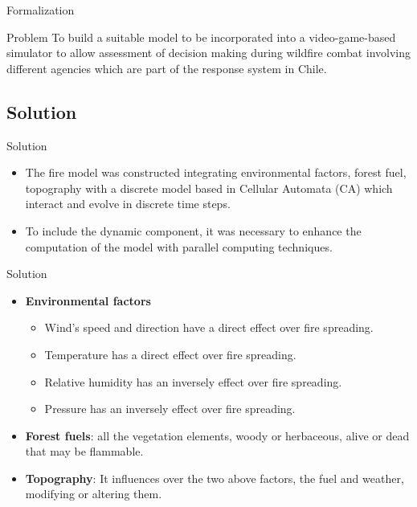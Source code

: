 \documentclass{beamer}
\begin{document}
        \begin{frame}{Formalization}
            \begin{block}{Problem}
                To build a suitable model to be incorporated into a video-game-based 
                simulator to allow assessment of decision making during wildfire combat 
                involving different agencies which are part of the response system in Chile.
            \end{block}
        \end{frame}
        
        
        \subsection{Solution}
        \begin{frame}{Solution}
            \begin{itemize}
                \item<1-> The fire model was constructed integrating environmental factors, forest 
                    fuel, topography with a discrete model based in Cellular Automata (CA) which interact 
                    and evolve in discrete time steps.
                \item<2-> To include the dynamic component, it was necessary to enhance 
                    the computation of the model with parallel computing techniques.
            \end{itemize}
        \end{frame}
        
        \begin{frame}{Solution}
            \begin{itemize}
                \item<1-> \textbf{Environmental factors}
                    \begin{itemize}
                        \item<1-> Wind's speed and direction have a direct effect over fire spreading.
                        \item<2-> Temperature has a direct effect over fire spreading.
                        \item<3-> Relative humidity has an inversely effect over fire spreading.
                        \item<4-> Pressure has an inversely effect over fire spreading.
                    \end{itemize}
                \item<5-> \textbf{Forest fuels}: all the vegetation elements, woody or herbaceous, 
                    alive or dead that may be flammable.
                \item<6-> \textbf{Topography}: It influences over the two above factors, the fuel and weather,
                    modifying or altering them.
            \end{itemize}
        \end{frame}
        
\end{document}
